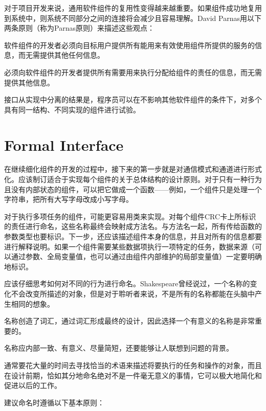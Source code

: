 对于项目开发来说，通用软件组件的复用性变得越来越重要。如果组件成功地复用到系统中，则系统不同部分之间的连接将会减少且容易理解。David Parnas用以下两条原则（称为Parnas原则）来描述这些观点：

\begin{compactitem}
\item 软件组件的开发者必须向目标用户提供所有能用来有效使用组件所提供的服务的信息，而无需提供其他任何信息。
\item 必须向软件组件的开发者提供所有需要用来执行分配给组件的责任的信息，而无需提供其他信息。
\end{compactitem}

接口从实现中分离的结果是，程序员可以在不影响其他软件组件的条件下，对多个具有同一结构、不同实现的组件进行试验。


\section{Formal Interface}

在继续细化组件的开发的过程中，接下来的第一步就是对通信模式和通道进行形式化。应该制订适合于实现每个组件的关于总体结构的设计原则。对于只有一种行为且没有内部状态的组件，可以把它做成一个函数——例如，一个组件只是处理一个字符串，把所有大写字母改成小写字母。

对于执行多项任务的组件，可能更容易用类来实现。对每个组件CRC卡上所标识的责任进行命名，这些名称最终会映射成方法名。与方法名一起，所有传给函数的参数类型也要标识。下一步，还应该描述组件本身的信息，并且对所有的信息都要进行解释说明。如果一个组件需要某些数据项执行一项特定的任务，数据来源（可以通过参数、全局变量值，也可以通过由组件内部维护的局部变量值）一定要明确地标识。

应该仔细思考如何对不同的行为进行命名。Shakespeare曾经说过，一个名称的变化不会改变所描述的对象，但是对于聆听者来说，不是所有的名称都能在头脑中产生相同的想象。

\begin{compactitem}
\item 名称创造了词汇，通过词汇形成最终的设计，因此选择一个有意义的名称是非常重要的。
\item 名称应内部一致、有意义、尽量简短，还要能够让人联想到问题的背景。
\end{compactitem}

通常要花大量的时间去寻找恰当的术语来描述将要执行的任务和操作的对象，而且在设计前期，恰如其分地命名绝对不是一件毫无意义的事情，它可以极大地简化和促进以后的工作。

建议命名时遵循以下基本原则：

